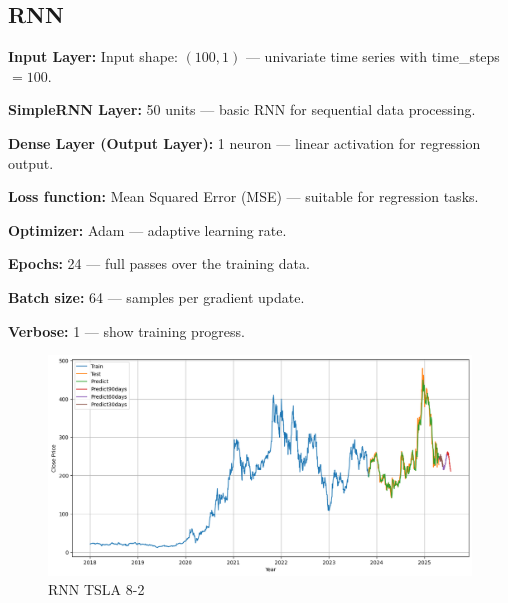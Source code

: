 \documentclass[12pt]{article}
\begin{document}
\subsection{RNN}

\textbf{Input Layer:} Input shape: $(100, 1)$ — univariate time series with time\_steps $= 100$.

\textbf{SimpleRNN Layer:} 50 units — basic RNN for sequential data processing.

\textbf{Dense Layer (Output Layer):} 1 neuron — linear activation for regression output.

\textbf{Loss function:} Mean Squared Error (MSE) — suitable for regression tasks.

\textbf{Optimizer:} Adam — adaptive learning rate.

\textbf{Epochs:} 24 — full passes over the training data.

\textbf{Batch size:} 64 — samples per gradient update.

\textbf{Verbose:} 1 — show training progress.

\begin{figure}[H]
    \centering
    \includegraphics[width=0.5\linewidth]{RNN.png}
    \caption{RNN TSLA 8-2 }
    \label{fig:boxplot}
\end{figure}



\renewcommand{\refname}{References}

\end{document}
